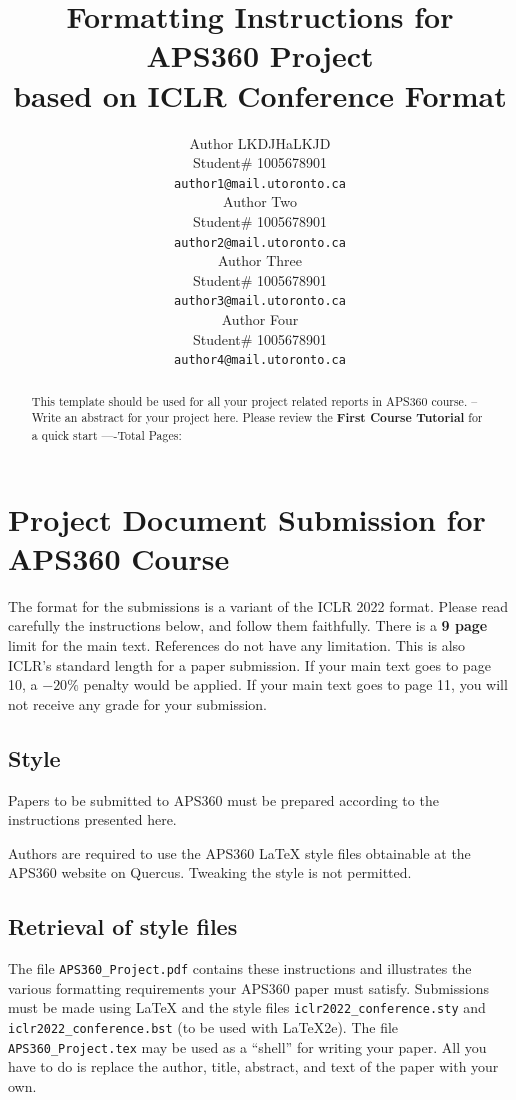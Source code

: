 \documentclass{article} %
\title{Formatting Instructions for APS360 Project  \\ 
based on ICLR Conference Format}
\author{Author LKDJHaLKJD  \\
Student\# 1005678901\\
\texttt{author1@mail.utoronto.ca} \\
\And
Author Two  \\
Student\# 1005678901 \\
\texttt{author2@mail.utoronto.ca} \\
\AND
Author Three  \\
Student\# 1005678901 \\
\texttt{author3@mail.utoronto.ca} \\
\And
Author Four \\
Student\# 1005678901 \\
\texttt{author4@mail.utoronto.ca} \\
\AND
}
\begin{document}
\maketitle

\begin{abstract}
This template should be used for all your project related reports in APS360 course. -- Write an abstract for your project here. Please review the \textbf{ First Course Tutorial} for a quick start
----Total Pages: \pageref{last_page}
\end{abstract}



\section{Project Document Submission for APS360 Course}


The format for the submissions is a variant of the ICLR 2022 format.
Please read carefully the instructions below, and follow them
faithfully. There is a \textbf{9 page} limit for the main text. References do not have any limitation. This is also ICLR's standard length for a paper submission. 
If your main text goes to page 10, a $-20\%$ penalty would be applied. If your main text goes to page 11, you will not receive any grade for your submission. 

\subsection{Style}

Papers to be submitted to APS360 must be prepared according to the
instructions presented here.

Authors are required to use the APS360 \LaTeX{} style files obtainable at the
APS360 website on Quercus. Tweaking the style is not permitted.

\subsection{Retrieval of style files}

The file \verb+APS360_Project.pdf+ contains these
instructions and illustrates the various formatting requirements your APS360 paper must satisfy.
Submissions must be made using \LaTeX{} and the style files
\verb+iclr2022_conference.sty+ and \verb+iclr2022_conference.bst+ (to be used with \LaTeX{}2e). The file
\verb+APS360_Project.tex+ may be used as a ``shell'' for writing your paper. All you have to do is replace the author, title, abstract, and text of the paper with
your own.
\end{document}
